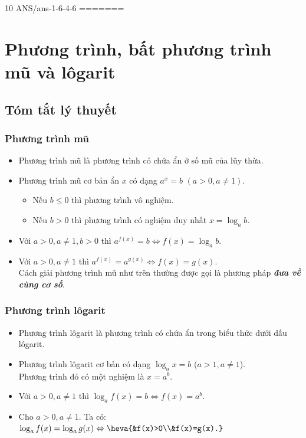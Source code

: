 \begin{indapan}{10}
	{ANS/ans-1-6-4-6}
=======
 
\section{Phương trình, bất phương trình mũ và lôgarit}
\subsection{Tóm tắt lý thuyết}
\begin{tomtat}
	\subsubsection{Phương trình mũ}
	\begin{itemize}
		\item Phương trình mũ là phương trình có chứa ẩn ở số mũ của lũy thừa.
		\item Phương trình mũ cơ bản ẩn $x$ có dạng $a^x=b \,\, (a>0, a\neq 1)$.
		\begin{itemize}
			\item Nếu $b\leq 0$ thì phương trình vô nghiệm.
			\item Nếu $b>0$ thì phương trình có nghiệm duy nhất $x=\log_a b$.
		\end{itemize}
	\end{itemize}
	\begin{nx}\hfill
		\begin{itemize}
			\item Với $a>0, a\neq 1, b>0$ thì $a^{f(x)}=b \Leftrightarrow f(x)=\log_a b$.
			\item Với $a>0, a\neq 1$ thì $a^{f(x)}=a^{g(x)} \Leftrightarrow f(x)=g(x)$.\\
			Cách giải phương trình mũ như trên thường được gọi là phương pháp \textbf{\textit{đưa về cùng cơ số}}.
		\end{itemize}
	\end{nx}
	\subsubsection{Phương trình lôgarit}
	\begin{itemize}
		\item Phương trình lôgarit là phương trình có chứa ẩn trong biểu thức dưới dấu lôgarit.
		\item Phương trình lôgarit cơ bản có dạng $\log_a x=b$ ($a>1, a\neq 1$).\\
		Phương trình đó có một nghiệm là $x=a^b$.
	\end{itemize}
	\begin{nx}\hfill
		\begin{itemize}
			\item Với $a>0, a\neq 1$ thì $\log_a f(x)=b \Leftrightarrow f(x)=a^b$.
			\item Cho $a>0, a\neq 1$. Ta có: $\log_a f(x)=\log_a g(x) \Leftrightarrow \heva{&f(x)>0\\&f(x)=g(x).}$
		\end{itemize}
	\end{nx}

\end{tomtat}
\end{indapan}
